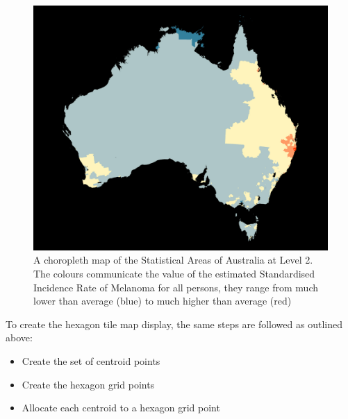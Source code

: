\documentclass{monashthesis}
\begin{document}
\begin{figure}[H]
\centering
\includegraphics[width=16cm]{figures/03-algorithm/aus_melanoma_p.pdf}
\caption{\label{fig:melanoma-geo}A choropleth map of the Statistical Areas of Australia at Level 2. The colours communicate the value of the estimated Standardised Incidence Rate of Melanoma for all persons, they range from much lower than average (blue) to much higher than average (red)}
\end{figure}

To create the hexagon tile map display, the same steps are followed as outlined above:

\begin{itemize}
\tightlist
\item
  Create the set of centroid points
\item
  Create the hexagon grid points
\item
  Allocate each centroid to a hexagon grid point
\end{itemize}
\end{document}

